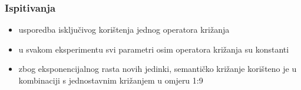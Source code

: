 \documentclass{beamer}
\begin{document}
\begin{frame}
\frametitle{Ispitivanja}
\begin{itemize}
\item{usporedba isključivog korištenja jednog operatora križanja}
\item{u svakom eksperimentu svi parametri osim operatora križanja su konstanti}
\item{zbog eksponencijalnog rasta novih jedinki, semantičko križanje korišteno je u kombinaciji s jednostavnim križanjem u omjeru 1:9}
\end{itemize}

\end{frame}
\end{document}
